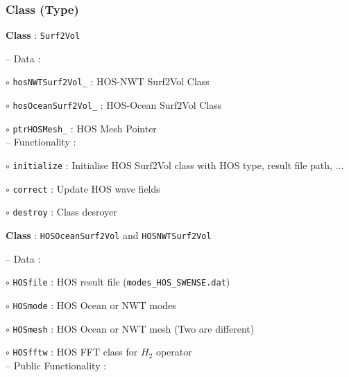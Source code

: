 \pagebreak
\subsubsection{Class (Type)}

\textbf{Class} : \texttt{Surf2Vol}

\hspace{0.5 cm} -- Data :

\hspace{1.0 cm} $\circ$ \texttt{hosNWTSurf2Vol\_} : HOS-NWT Surf2Vol Class

\hspace{1.0 cm} $\circ$ \texttt{hosOceanSurf2Vol\_} : HOS-Ocean Surf2Vol Class

\hspace{1.0 cm} $\circ$ \texttt{ptrHOSMesh\_} : HOS Mesh Pointer\\

\hspace{0.5 cm} -- Functionality :

\hspace{1.0 cm} $\circ$ \texttt{initialize} : Initialise HOS Surf2Vol class with HOS type, result file path, ...

\hspace{1.0 cm} $\circ$ \texttt{correct} : Update HOS wave fields

\hspace{1.0 cm} $\circ$ \texttt{destroy} : Class desroyer\\    

\vspace{0.1cm}

\textbf{Class} : \texttt{HOSOceanSurf2Vol} and \texttt{HOSNWTSurf2Vol}

\hspace{0.5 cm} -- Data :

\hspace{1.0 cm} $\circ$ \texttt{HOSfile} : HOS result file (\texttt{modes\_HOS\_SWENSE.dat})

\hspace{1.0 cm} $\circ$ \texttt{HOSmode} : HOS Ocean or NWT modes

\hspace{1.0 cm} $\circ$ \texttt{HOSmesh} : HOS Ocean or NWT mesh (Two are different)

\hspace{1.0 cm} $\circ$ \texttt{HOSfftw} : HOS FFT class for $H_2$ operator \\

\hspace{0.5 cm} -- Public Functionality :

